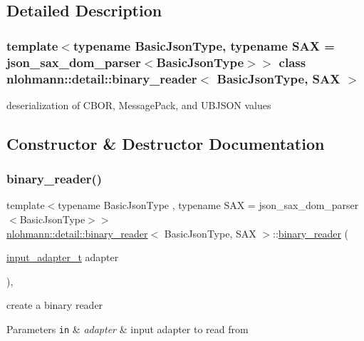 \subsection{Detailed Description}
\subsubsection*{template$<$typename Basic\+Json\+Type, typename S\+AX = json\+\_\+sax\+\_\+dom\+\_\+parser$<$\+Basic\+Json\+Type$>$$>$\newline
class nlohmann\+::detail\+::binary\+\_\+reader$<$ Basic\+Json\+Type, S\+A\+X $>$}

deserialization of C\+B\+OR, Message\+Pack, and U\+B\+J\+S\+ON values 

\subsection{Constructor \& Destructor Documentation}
\mbox{\label{classnlohmann_1_1detail_1_1binary__reader_aed84f0302eb232d3b69f7653bef2337a}} 
\subsubsection{\texorpdfstring{binary\+\_\+reader()}{binary\_reader()}}
{\footnotesize\ttfamily template$<$typename Basic\+Json\+Type , typename S\+AX  = json\+\_\+sax\+\_\+dom\+\_\+parser$<$\+Basic\+Json\+Type$>$$>$ \\
\hyperlink{classnlohmann_1_1detail_1_1binary__reader}{nlohmann\+::detail\+::binary\+\_\+reader}$<$ Basic\+Json\+Type, S\+AX $>$\+::\hyperlink{classnlohmann_1_1detail_1_1binary__reader}{binary\+\_\+reader} (\begin{DoxyParamCaption}\item[{\hyperlink{namespacenlohmann_1_1detail_ae132f8cd5bb24c5e9b40ad0eafedf1c2}{input\+\_\+adapter\+\_\+t}}]{adapter }\end{DoxyParamCaption})\hspace{0.3cm}{\ttfamily [inline]}, {\ttfamily [explicit]}}



create a binary reader 


\begin{DoxyParams}[1]{Parameters}
\mbox{\tt in}  & {\em adapter} & input adapter to read from \\
\hline
\end{DoxyParams}


